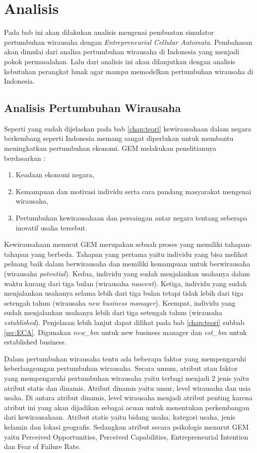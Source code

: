 \chapter{Analisis}
\label{chap:analisis}


Pada bab ini akan dilakukan analisis mengenai pembuatan simulator pertumbuhan wirausaha dengan \textit{Entrepreneurial Cellular Automata}. Pembahasan akan dimulai dari analisa pertumbuhan wirausaha di Indonesia yang menjadi pokok permasalahan. Lalu dari analisis ini akan dilanjutkan dengan analisis kebutuhan perangkat lunak agar mampu memodelkan pertumbuhan wirausaha di Indonesia.

\section{Analisis Pertumbuhan Wirausaha}
\label{sec:analisisPertumbuhanWirausaha}

Seperti yang sudah dijelaskan pada bab \ref{chap:teori} kewirausahaan dalam negara berkembang seperti Indonesia memang sangat diperlukan untuk membantu meningkatkan pertumbuhan ekonomi. GEM melakukan penelitiannya berdasarkan :
\begin{enumerate}
	\item Keadaan ekonomi negara,
	\item Kemampuan dan motivasi individu serta cara pandang masyarakat mengenai wirausaha,
	\item Pertumbuhan kewirausahaan dan persaingan antar negara tentang seberapa inovatif usaha tersebut.
\end{enumerate}  

Kewirausahaan menurut GEM merupakan sebuah proses yang memiliki tahapan-tahapan yang berbeda. Tahapan yang pertama yaitu individu yang bisa melihat peluang baik dalam berwirausaha dan memiliki kemampuan untuk berwirausaha (wirausaha \textit{potential}). Kedua, individu yang sudah menjalankan usahanya dalam waktu kurang dari tiga bulan (wirausaha \textit{nascent}). Ketiga, individu yang sudah menjalankan usahanya selama lebih dari tiga bulan tetapi tidak lebih dari tiga setengah tahun (wirausaha \textit{new business manager}). Keempat, individu yang sudah menjalankan usahanya lebih dari tiga setengah tahun (wirausaha \textit{established}). Penjelasan lebih lanjut dapat dilihat pada bab \ref{chap:teori} subbab \ref{sec:ECA}. Digunakan \textit{new\_bm} untuk new business manager dan \textit{est\_bm} untuk established business. 


Dalam pertumbuhan wirausaha tentu ada beberapa faktor yang mempengaruhi keberlangsungan pertumbuhan wirausaha. Secara umum, atribut atau faktor yang mempengaruhi pertumbuhan wirausaha yaitu terbagi menjadi 2 jenis yaitu atribut statis dan dinamis. Atribut dinamis yaitu umur, level wirausaha dan usia usaha. Di antara atribut dinamis, level wirausaha menjadi atribut penting karena atribut ini yang akan dijadikan sebagai acuan untuk menentukan perkembangan dari kewirausahaan. Atribut statis yaitu bidang usaha, kategori usaha, jenis kelamin dan lokasi geografis. Sedangkan atribut secara psikologis menurut GEM yaitu Perceived Opportunities, Perceived Capabilities, Entrepreneurial Intention dan Fear of Failure Rate. 


